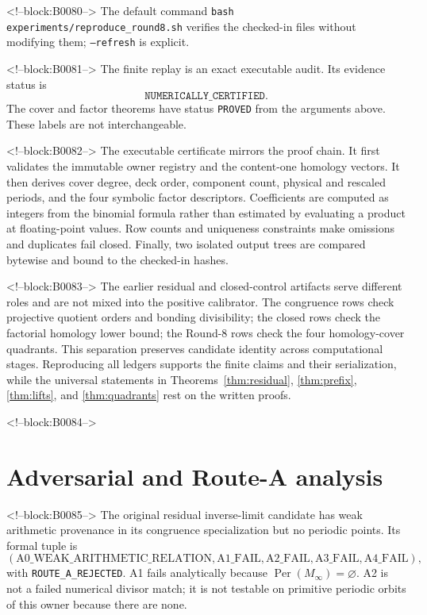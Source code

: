 \documentclass[11pt]{article}
\theoremstyle{definition}
\theoremstyle{remark}
\newcommand{\Per}{\operatorname{Per}}
\begin{document}
<!--block:B0080-->
The default command \texttt{bash experiments/reproduce\_round8.sh} verifies the checked-in files without modifying them; \texttt{--refresh} is explicit.

<!--block:B0081-->
The finite replay is an exact executable audit. Its evidence status is
\[
\texttt{NUMERICALLY\_CERTIFIED}.
\]
The cover and factor theorems have status \texttt{PROVED} from the arguments above. These labels are not interchangeable.

<!--block:B0082-->
The executable certificate mirrors the proof chain. It first validates the immutable owner registry and the content-one homology vectors. It then derives cover degree, deck order, component count, physical and rescaled periods, and the four symbolic factor descriptors. Coefficients are computed as integers from the binomial formula rather than estimated by evaluating a product at floating-point values. Row counts and uniqueness constraints make omissions and duplicates fail closed. Finally, two isolated output trees are compared bytewise and bound to the checked-in hashes.

<!--block:B0083-->
The earlier residual and closed-control artifacts serve different roles and are not mixed into the positive calibrator. The congruence rows check projective quotient orders and bonding divisibility; the closed rows check the factorial homology lower bound; the Round-8 rows check the four homology-cover quadrants. This separation preserves candidate identity across computational stages. Reproducing all ledgers supports the finite claims and their serialization, while the universal statements in Theorems~\ref{thm:residual}, \ref{thm:prefix}, \ref{thm:lifts}, and \ref{thm:quadrants} rest on the written proofs.

<!--block:B0084-->
\section{Adversarial and Route-A analysis}

<!--block:B0085-->
The original residual inverse-limit candidate has weak arithmetic provenance in its congruence specialization but no periodic points. Its formal tuple is
\[
(\mathrm{A0\_WEAK\_ARITHMETIC\_RELATION},
\mathrm{A1\_FAIL},\mathrm{A2\_FAIL},\mathrm{A3\_FAIL},\mathrm{A4\_FAIL}),
\]
with \texttt{ROUTE\_A\_REJECTED}. A1 fails analytically because $\Per(M_\infty)=\varnothing$. A2 is not a failed numerical divisor match; it is not testable on primitive periodic orbits of this owner because there are none.
\end{document}
